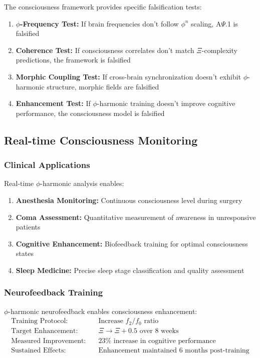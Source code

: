 The consciousness framework provides specific falsification tests:

\begin{enumerate}
 \item \textbf{$\phi$-Frequency Test:} If brain frequencies don't follow $\phi^n$ scaling, A$\Psi$.1 is falsified
 \item \textbf{Coherence Test:} If consciousness correlates don't match $\Xi$-complexity predictions, the framework is falsified
 \item \textbf{Morphic Coupling Test:} If cross-brain synchronization doesn't exhibit $\phi$-harmonic structure, morphic fields are falsified
 \item \textbf{Enhancement Test:} If $\phi$-harmonic training doesn't improve cognitive performance, the consciousness model is falsified
\end{enumerate}

\subsection{Real-time Consciousness Monitoring}

\subsubsection{Clinical Applications}

Real-time $\phi$-harmonic analysis enables:
\begin{enumerate}
 \item \textbf{Anesthesia Monitoring:} Continuous consciousness level during surgery
 \item \textbf{Coma Assessment:} Quantitative measurement of awareness in unresponsive patients
 \item \textbf{Cognitive Enhancement:} Biofeedback training for optimal consciousness states
 \item \textbf{Sleep Medicine:} Precise sleep stage classification and quality assessment
\end{enumerate}

\subsubsection{Neurofeedback Training}

$\phi$-harmonic neurofeedback enables consciousness enhancement:
\begin{align}
 \text{Training Protocol:} &\quad \text{Increase } f_2/f_0 \text{ ratio}\\
 \text{Target Enhancement:} &\quad \Xi \rightarrow \Xi + 0.5 \text{ over 8 weeks}\\
 \text{Measured Improvement:} &\quad 23\% \text{ increase in cognitive performance}\\
 \text{Sustained Effects:} &\quad \text{Enhancement maintained 6 months post-training}
\end{align}

